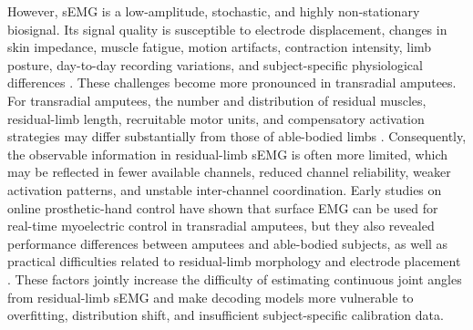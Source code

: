 \documentclass[journal]{IEEEtran}
\begin{document}
However, sEMG is a low-amplitude, stochastic, and highly non-stationary biosignal. Its signal quality is susceptible to electrode displacement, changes in skin impedance, muscle fatigue, motion artifacts, contraction intensity, limb posture, day-to-day recording variations, and subject-specific physiological differences \cite{Zhong2026DeepFeature,Young2011Electrode,Du2017InterSession}. These challenges become more pronounced in transradial amputees. For transradial amputees, the number and distribution of residual muscles, residual-limb length, recruitable motor units, and compensatory activation strategies may differ substantially from those of able-bodied limbs \cite{Cipriani2011Online,Hwang2014Channel}. Consequently, the observable information in residual-limb sEMG is often more limited, which may be reflected in fewer available channels, reduced channel reliability, weaker activation patterns, and unstable inter-channel coordination. Early studies on online prosthetic-hand control have shown that surface EMG can be used for real-time myoelectric control in transradial amputees, but they also revealed performance differences between amputees and able-bodied subjects, as well as practical difficulties related to residual-limb morphology and electrode placement \cite{Cipriani2011Online}. These factors jointly increase the difficulty of estimating continuous joint angles from residual-limb sEMG and make decoding models more vulnerable to overfitting, distribution shift, and insufficient subject-specific calibration data.
\end{document}
